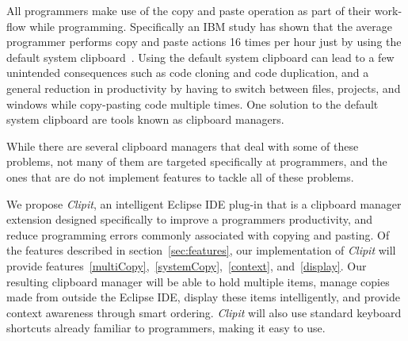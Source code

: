 \documentclass{acm_proc_article-sp}
\begin{document}
All programmers make use of the copy and paste operation as part of their work-flow while programming. Specifically an IBM study has shown that the average programmer performs copy and paste actions 16 times per hour just by using the default system clipboard~\cite{ooplCP}. Using the default system clipboard can lead to a few unintended consequences such as code cloning and code duplication, and a general reduction in productivity by having to switch between files, projects, and windows while copy-pasting code multiple times. One solution to the default system clipboard are tools known as clipboard managers.

While there are several clipboard managers that deal with some of these problems, not many of them are targeted specifically at programmers, and the ones that are do not implement features to tackle all of these problems.

We propose \textit{Clipit}, an intelligent Eclipse IDE plug-in that is a clipboard manager extension designed specifically to improve a programmers productivity, and reduce programming errors commonly associated with copying and pasting. Of the features described in section~\ref{sec:features}, our implementation of \textit{Clipit} will provide features~\ref{multiCopy},~\ref{systemCopy},~\ref{context}, and~\ref{display}. Our resulting clipboard manager will be able to hold multiple items, manage copies made from outside the Eclipse IDE, display these items intelligently, and provide context awareness through smart ordering. \textit{Clipit} will also use standard keyboard shortcuts already familiar to programmers, making it easy to use.




\end{document}
